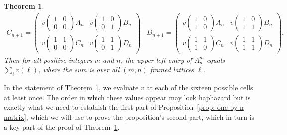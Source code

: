 \documentclass[12pt]{article}
\theoremstyle{plain}
\newtheorem{thm}{Theorem}[section]
\theoremstyle{remark}
\theoremstyle{definition}
\theoremstyle{remark}
\theoremstyle{definition}
\begin{document}
\begin{thm}
\begin{eqnarray*}
C_{n+1}=\begin{pmatrix}v(\begin{smallmatrix}1 & 0\\ 0 & 0 \end{smallmatrix})A_{n} & v(\begin{smallmatrix}1 & 0\\ 0 & 1 \end{smallmatrix})B_{n}\\ v(\begin{smallmatrix}1 & 1\\ 0 & 0 \end{smallmatrix})C_{n} & v(\begin{smallmatrix}1 & 1\\ 0 & 1 \end{smallmatrix})D_{n} \end{pmatrix} & D_{n+1}=\begin{pmatrix}v(\begin{smallmatrix}1 & 0\\ 1 & 0 \end{smallmatrix})A_{n} & v(\begin{smallmatrix}1 & 0\\ 1 & 1 \end{smallmatrix})B_{n}\\ v(\begin{smallmatrix}1 & 1\\ 1 & 0 \end{smallmatrix})C_{n} & v(\begin{smallmatrix}1 & 1\\ 1 & 1 \end{smallmatrix})D_{n} \end{pmatrix}.
\end{eqnarray*}
Then for all positive integers $m$ and $n$, the upper left entry
of $A^{m}_{n}$ equals $\sum_{\ell}v\left(\ell\right)$, where the
sum is over all $\left(m,n\right)$ framed lattices $\ell$.
\label{thm: m by n matrix} 
\end{thm}

In the statement of Theorem~\ref{thm: m by n matrix}, we evaluate $v$ at each of the sixteen possible cells at least once. The order in which these values appear may look haphazard but is exactly what we need to establish the first part of Proposition~\ref{prop: one by n matrix}, which we will use to prove the proposition's second part, which in turn is a key part of the proof of Theorem~\ref{thm: m by n matrix}.
\end{document}
